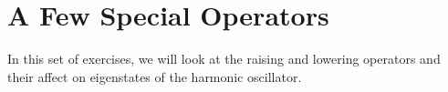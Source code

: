 %
%
%
%

\section*{A Few Special Operators}

	In this set of exercises, we will look at the raising and lowering operators and their affect on eigenstates of the harmonic oscillator.

